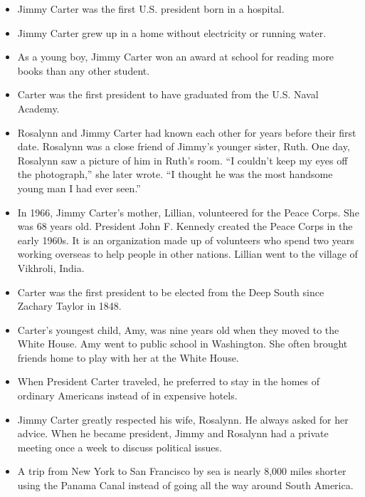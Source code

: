 \documentclass{article}
\begin{document}
\begin{itemize}
\item Jimmy Carter was the first U.S. president born in a hospital.

\item Jimmy Carter grew up in a home without electricity or running water.

\item As a young boy, Jimmy Carter won an award at school for reading more books than any other student.

\item Carter was the first president to have graduated from the U.S. Naval Academy.

\item Rosalynn and Jimmy Carter had known each other for years before their first date. Rosalynn was a close friend of Jimmy's younger sister, Ruth. One day, Rosalynn saw a picture of him in Ruth's room. ``I couldn't keep my eyes off the photograph,'' she later wrote. ``I thought he was the most handsome young man I had ever seen.''

\item In 1966, Jimmy Carter's mother, Lillian, volunteered for the Peace Corps. She was 68 years old. President John F. Kennedy created the Peace Corps in the early 1960s. It is an organization made up of volunteers who spend two years working overseas to help people in other nations. Lillian went to the village of Vikhroli, India.

\item Carter was the first president to be elected from the Deep South since Zachary Taylor in 1848.

\item Carter's youngest child, Amy, was nine years old when they moved to the White House. Amy went to public school in Washington. She often brought friends home to play with her at the White House.

\item When President Carter traveled, he preferred to stay in the homes of ordinary Americans instead of in expensive hotels.

\item Jimmy Carter greatly respected his wife, Rosalynn. He always asked for her advice. When he became president, Jimmy and Rosalynn had a private meeting once a week to discuss political issues.

\item A trip from New York to San Francisco by sea is nearly 8,000 miles shorter using the Panama Canal instead of going all the way around South America.


\end{itemize}
\end{document}

